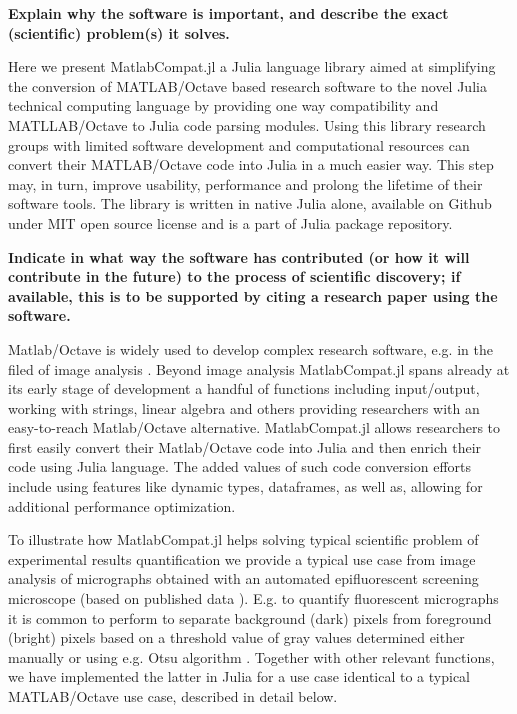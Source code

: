 \textbf{Explain why the software is important, and describe the exact (scientific) problem(s) it solves.}

Here we present MatlabCompat.jl a Julia language library aimed at simplifying the conversion of MATLAB/Octave based research software to the novel Julia technical computing language by providing one way compatibility and MATLLAB/Octave to Julia code parsing modules. Using this library research groups with limited software development and computational resources can convert their MATLAB/Octave code into Julia in a much easier way. This step may, in turn, improve usability, performance and prolong the lifetime of their software tools. The library is written in native Julia alone, available on Github under MIT open source license and is a part of Julia package repository.

\textbf{Indicate in what way the software has contributed (or how it will contribute in the future) to the process of scientific discovery; if available, this is to be supported by citing a research paper using the software.}

Matlab/Octave is widely used to develop complex research software, e.g. in the filed of image analysis \cite{Kiss_2014, 17076895}. Beyond image analysis MatlabCompat.jl spans already at its early stage of development a handful of functions including input/output, working with strings, linear algebra and others providing researchers with an easy-to-reach Matlab/Octave alternative. MatlabCompat.jl allows researchers to first easily convert their Matlab/Octave code into Julia and then enrich their code using Julia language. The added values of such code conversion efforts include using features like dynamic types, dataframes, as well as, allowing for additional performance optimization.

To illustrate how MatlabCompat.jl helps solving typical scientific problem of experimental results quantification we provide a typical use case from image analysis of micrographs obtained with an automated epifluorescent screening microscope (based on published data \cite{22787215}). E.g. to quantify fluorescent micrographs it is common to perform to separate background (dark) pixels from foreground (bright) pixels based on a threshold value of gray values determined either manually or using e.g. Otsu algorithm \cite{otsu1975threshold}. Together with other relevant functions, we have implemented the latter in Julia for a use case identical to a typical MATLAB/Octave use case, described in detail below.

